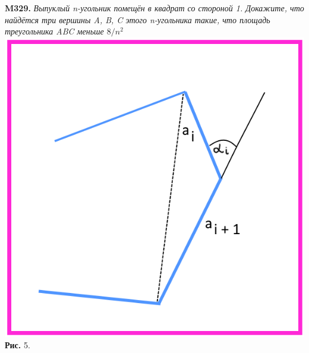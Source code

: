 \newpage
\begin{minipage}[t]{0.25\linewidth}
	\textbf{M329.}
	\textit{Выпуклый n-угольник помещён в квадрат со стороной 1. Докажите,
	что найдётся три вершины A, B, C этого n-угольника такие,
	что площадь треугольника ABC меньше $8/n^2$}
	\includegraphics[width=\textwidth]{Lab7.png}
	\hfill
	\textbf{Рис.} 5.
\end{minipage}
\hfill
